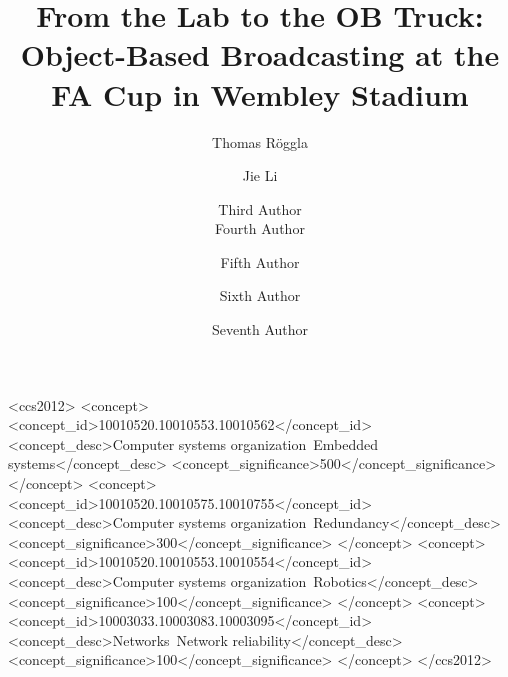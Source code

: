 \documentclass[sigchi-a, authorversion]{acmart}
\begin{document}
\title{From the Lab to the OB Truck: Object-Based Broadcasting at the FA Cup in Wembley Stadium}

\author{Thomas R\"{o}ggla}

\author{Jie Li}

\author{Third Author \\
  Fourth Author}

\author{Fifth Author}

\author{Sixth Author}

\author{Seventh Author}

\renewcommand{\shortauthors}{F. Author et al.}


%
%
\begin{CCSXML}
<ccs2012>
 <concept>
  <concept_id>10010520.10010553.10010562</concept_id>
  <concept_desc>Computer systems organization~Embedded systems</concept_desc>
  <concept_significance>500</concept_significance>
 </concept>
 <concept>
  <concept_id>10010520.10010575.10010755</concept_id>
  <concept_desc>Computer systems organization~Redundancy</concept_desc>
  <concept_significance>300</concept_significance>
 </concept>
 <concept>
  <concept_id>10010520.10010553.10010554</concept_id>
  <concept_desc>Computer systems organization~Robotics</concept_desc>
  <concept_significance>100</concept_significance>
 </concept>
 <concept>
  <concept_id>10003033.10003083.10003095</concept_id>
  <concept_desc>Networks~Network reliability</concept_desc>
  <concept_significance>100</concept_significance>
 </concept>
</ccs2012>
\end{CCSXML}
\end{document}
